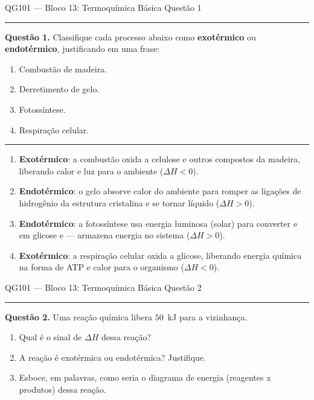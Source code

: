 \documentclass[10pt,a4paper]{article}
\newcommand{\questaoheader}[1]{%
  \begin{center}
  {\small\sffamily QG101 --- Bloco 13: Termoquímica Básica
  \hfill Questão #1}
  \end{center}
  \vspace{-0.3cm}
  \noindent\rule{\textwidth}{0.6pt}
  \vspace{0.1cm}
}
\newcommand{\resolucaosep}{%
  \vspace{0.4cm}
  \noindent\rule{\textwidth}{0.4pt}
  \vspace{0.1cm}

  \noindent{\bf Resolução:}
  \vspace{0.2cm}
}
\begin{document}
\pagestyle{empty}

\questaoheader{1}

\noindent\textbf{Questão 1.}
Classifique cada processo abaixo como \textbf{exotérmico} ou
\textbf{endotérmico}, justificando em uma frase:
\begin{enumerate}
  \item Combustão de madeira.
  \item Derretimento de gelo.
  \item Fotossíntese.
  \item Respiração celular.
\end{enumerate}

\resolucaosep

\begin{enumerate}
  \item \textbf{Exotérmico}: a combustão oxida a celulose e outros
        compostos da madeira, liberando calor e luz para o ambiente
        ($\Delta H < 0$).

  \item \textbf{Endotérmico}: o gelo absorve calor do ambiente para romper
        as ligações de hidrogênio da estrutura cristalina e se tornar líquido
        ($\Delta H > 0$).

  \item \textbf{Endotérmico}: a fotossíntese usa energia luminosa (solar)
        para converter  e  em glicose e  ---
        armazena energia no sistema ($\Delta H > 0$).

  \item \textbf{Exotérmico}: a respiração celular oxida a glicose,
        liberando energia química na forma de ATP e calor para o organismo
        ($\Delta H < 0$).
\end{enumerate}

\clearpage

\questaoheader{2}

\noindent\textbf{Questão 2.}
Uma reação química libera $50$~kJ para a vizinhança.
\begin{enumerate}
  \item Qual é o sinal de $\Delta H$ dessa reação?
  \item A reação é exotérmica ou endotérmica? Justifique.
  \item Esboce, em palavras, como seria o diagrama de energia
        (reagentes x produtos) dessa reação.
\end{enumerate}
\end{document}
